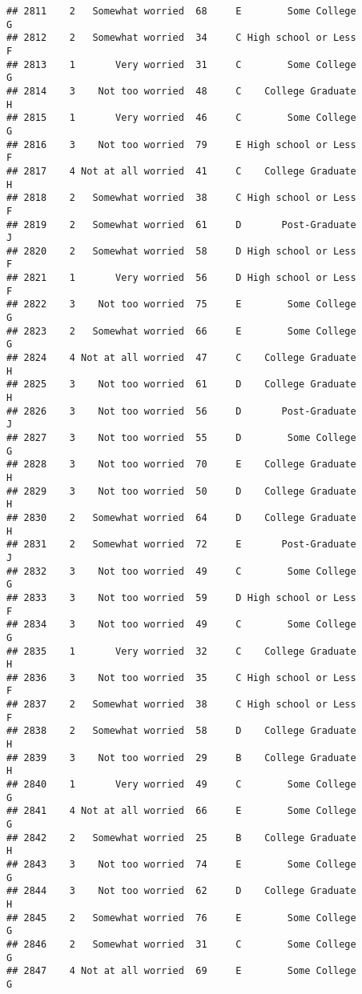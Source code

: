 \documentclass[
]{article}
\begin{document}
\begin{verbatim}
## 2811    2   Somewhat worried  68     E        Some College         G
## 2812    2   Somewhat worried  34     C High school or Less         F
## 2813    1       Very worried  31     C        Some College         G
## 2814    3    Not too worried  48     C    College Graduate         H
## 2815    1       Very worried  46     C        Some College         G
## 2816    3    Not too worried  79     E High school or Less         F
## 2817    4 Not at all worried  41     C    College Graduate         H
## 2818    2   Somewhat worried  38     C High school or Less         F
## 2819    2   Somewhat worried  61     D       Post-Graduate         J
## 2820    2   Somewhat worried  58     D High school or Less         F
## 2821    1       Very worried  56     D High school or Less         F
## 2822    3    Not too worried  75     E        Some College         G
## 2823    2   Somewhat worried  66     E        Some College         G
## 2824    4 Not at all worried  47     C    College Graduate         H
## 2825    3    Not too worried  61     D    College Graduate         H
## 2826    3    Not too worried  56     D       Post-Graduate         J
## 2827    3    Not too worried  55     D        Some College         G
## 2828    3    Not too worried  70     E    College Graduate         H
## 2829    3    Not too worried  50     D    College Graduate         H
## 2830    2   Somewhat worried  64     D    College Graduate         H
## 2831    2   Somewhat worried  72     E       Post-Graduate         J
## 2832    3    Not too worried  49     C        Some College         G
## 2833    3    Not too worried  59     D High school or Less         F
## 2834    3    Not too worried  49     C        Some College         G
## 2835    1       Very worried  32     C    College Graduate         H
## 2836    3    Not too worried  35     C High school or Less         F
## 2837    2   Somewhat worried  38     C High school or Less         F
## 2838    2   Somewhat worried  58     D    College Graduate         H
## 2839    3    Not too worried  29     B    College Graduate         H
## 2840    1       Very worried  49     C        Some College         G
## 2841    4 Not at all worried  66     E        Some College         G
## 2842    2   Somewhat worried  25     B    College Graduate         H
## 2843    3    Not too worried  74     E        Some College         G
## 2844    3    Not too worried  62     D    College Graduate         H
## 2845    2   Somewhat worried  76     E        Some College         G
## 2846    2   Somewhat worried  31     C        Some College         G
## 2847    4 Not at all worried  69     E        Some College         G

\end{verbatim}
\end{document}
